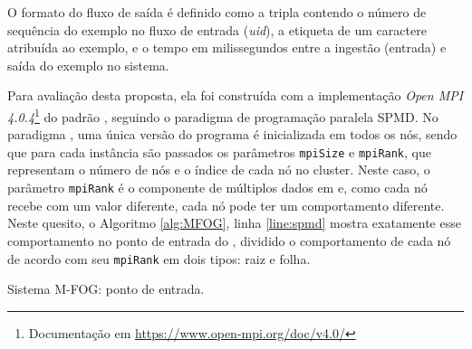 O formato do fluxo de saída é definido como a tripla contendo o número de
sequência do exemplo no fluxo de entrada (\emph{uid}), a etiqueta de um caractere
atribuída ao exemplo, e o tempo em milissegundos entre a ingestão (entrada) e saída
do exemplo no sistema.


Para avaliação desta proposta, ela foi construída com a implementação \emph{Open
MPI 4.0.4}\footnote{Documentação em \url{https://www.open-mpi.org/doc/v4.0/}} do
padrão \mpi, seguindo o paradigma de programação paralela \acf{SPMD}.
No paradigma \spmd, uma única versão do programa é inicializada em todos os nós, sendo que
para cada instância são passados os parâmetros \texttt{mpiSize} e
\texttt{mpiRank}, que representam o número de nós e o índice de cada nó no
cluster.
Neste caso, o parâmetro \texttt{mpiRank} é o componente de múltiplos dados em
\spmd e, como cada nó recebe com um valor diferente, cada nó pode ter um
comportamento diferente.
Neste quesito, o Algoritmo \ref{alg:MFOG}, linha \ref{line:spmd} mostra
exatamente esse comportamento no ponto de entrada do \mfog, dividido o
comportamento de cada nó de acordo com seu \texttt{mpiRank} em dois tipos: raiz
e folha.



\begin{algorithm}[htb]
    
    \KwParams{\mpiRank, \mpiSize}
\caption{Sistema M-FOG: ponto de entrada.}
\label{alg:MFOG}
\end{algorithm}

